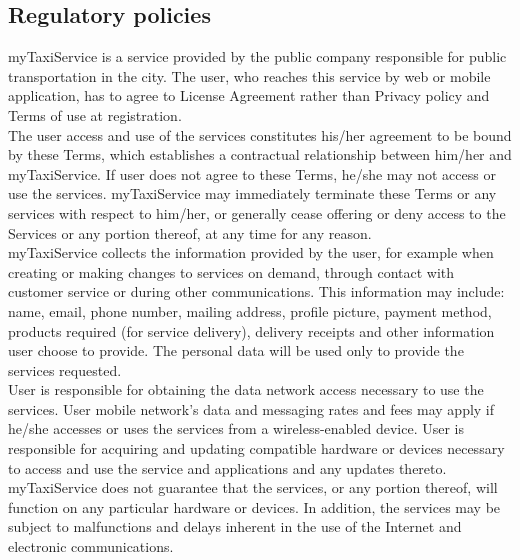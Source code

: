 \subsection{Regulatory policies}
myTaxiService is a service provided by the public company responsible for public transportation in the city. The user, who reaches this service by web or mobile application, has to agree to License Agreement rather than Privacy policy and Terms of use at registration.\\
The user access and use of the services constitutes his/her agreement to be bound by these Terms, which establishes a contractual relationship between him/her and myTaxiService. If user does not agree to these Terms, he/she may not access or use the services. myTaxiService may immediately terminate these Terms or any services with respect to him/her, or generally cease offering or deny access to the Services or any portion thereof, at any time for any reason.\\
myTaxiService collects the information provided by the user, for example when creating or making changes to services on demand, through contact with customer service or during other communications. This information may include: name, email, phone number, mailing address, profile picture, payment method, products required (for service delivery), delivery receipts and other information user choose to provide. The personal data will be used only to provide the services requested.\\
User is responsible for obtaining the data network access necessary to use the services. User mobile network's data and messaging rates and fees may apply if he/she accesses or uses the services from a wireless-enabled device. User is responsible for acquiring and updating compatible hardware or devices necessary to access and use the service and applications and any updates thereto.\\
myTaxiService does not guarantee that the services, or any portion thereof, will function on any particular hardware or devices. In addition, the services may be subject to malfunctions and delays inherent in the use of the Internet and electronic communications.

